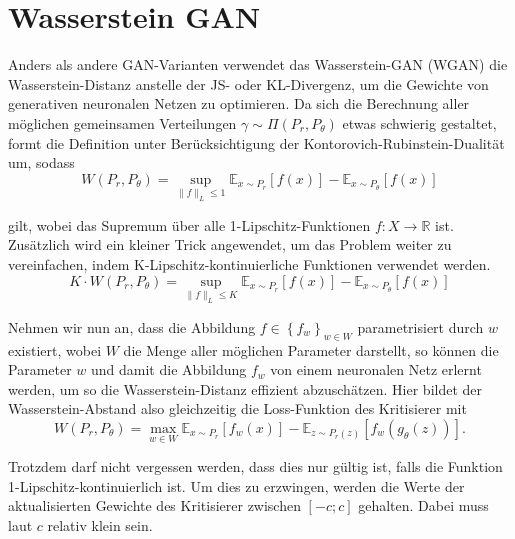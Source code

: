 \documentclass{hsflensburg}
\begin{document}
  \section{Wasserstein GAN}
  Anders als andere GAN-Varianten verwendet das Wasserstein-GAN (WGAN) die
  Was\-ser\-stein-Distanz anstelle der JS- oder KL-Divergenz, um die Gewichte
  von generativen neuronalen Netzen zu optimieren. Da sich die Berechnung aller
  möglichen gemeinsamen Verteilungen $\gamma \sim \Pi(P_r, P_\theta)$ etwas schwierig
  gestaltet, formt \cite{arjovsky2017wasserstein} die Definition unter
  Berücksichtigung der Kontorovich-Rubinstein-Dualität um, sodass
  \[
    W(P_r, P_\theta) = \sup_{\|f\|_L \leq 1} \mathbb{E}_{x \sim P_r}\left[f(x)\right] - \mathbb{E}_{x \sim P_\theta}\left[f(x)\right]
  \]

  gilt, wobei das Supremum über alle 1-Lipschitz-Funktionen $f : X \to
  \mathbb{R}$ ist. Zusätzlich wird ein kleiner Trick angewendet, um das Problem
  weiter zu vereinfachen, indem K-Lipschitz-kontinuierliche Funktionen verwendet
  werden.
  \[
    K \cdot W(P_r, P_\theta) = \sup_{\|f\|_L \leq K} \mathbb{E}_{x \sim P_r}\left[f(x)\right] - \mathbb{E}_{x \sim P_\theta}\left[f(x)\right]
  \]

  Nehmen wir nun an, dass die Abbildung $f \in \left\{f_w\right\}_{w \in W}$
  parametrisiert durch $w$ existiert, wobei $W$ die Menge aller möglichen
  Parameter darstellt, so können die Parameter $w$ und damit die Abbildung $f_w$
  von einem neuronalen Netz erlernt werden, um so die Wasserstein-Distanz
  effizient abzuschätzen. Hier bildet der Wasserstein-Abstand also gleichzeitig
  die Loss-Funktion des Kritisierer mit
  \[
    W(P_r, P_\theta) = \max_{w \in W} \mathbb{E}_{x \sim P_r}\left[f_w(x)\right]
    - \mathbb{E}_{z \sim P_r(z)}\left[f_w(g_\theta(z))\right].
  \]

  Trotzdem darf nicht vergessen werden, dass dies nur gültig ist, falls die
  Funktion 1-Lipschitz-kontinuierlich ist. Um dies zu erzwingen, werden die
  Werte der aktualisierten Gewichte des Kritisierer zwischen $\left[-c; c\right]$
  gehalten. Dabei muss laut \cite{arjovsky2017wasserstein} $c$ relativ klein
  sein.
\end{document}

